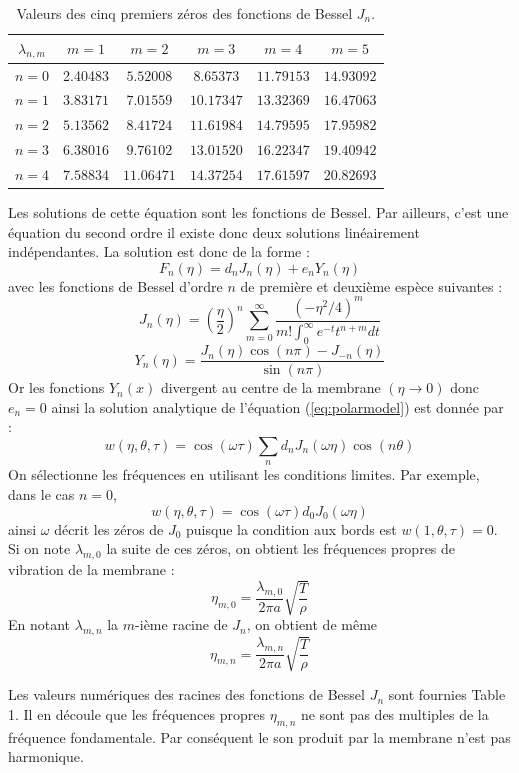 \documentclass[a4,12pt]{article}
\begin{document}
\begin{table}
	\begin{center}
		\begin{tabular}{|c|c|c|c|c|c|}
			\hline
			$\lambda_{n,m}$&$m=1$  &$m=2$ & $m=3$ &$ m=4$&$m=5$\\
			\hline
			$n=0$&2.40483&$5.52008$&$8.65373$&$11.79153$&$14.93092$\\
			\hline
			$n=1$&$3.83171$&$7.01559$&$10.17347$&$13.32369$&$16.47063$\\
			\hline
			$n=2$&$5.13562$&$8.41724$&$11.61984$&$14.79595$&$17.95982$\\
			\hline
			$n=3$&$6.38016$&$9.76102$&$13.01520$&$16.22347$&$19.40942$\\
			\hline
			$n=4$&$7.58834$&$11.06471$&$14.37254$&$17.61597$&$20.82693$\\
			\hline
		\end{tabular}
		\caption{Valeurs des cinq premiers zéros des fonctions de Bessel $J_n$.}
 	\end{center}
\end{table}

Les solutions de cette équation sont les fonctions de Bessel. Par ailleurs, c'est une équation du second ordre il existe donc deux solutions linéairement indépendantes. La solution est donc de la forme :
\[
F_n(\eta)=d_nJ_n(\eta)+e_nY_n(\eta)
\]
avec les fonctions de Bessel d'ordre $n$ de première et deuxième espèce suivantes :
\[
J_n(\eta)=\left(\dfrac{\eta}{2}\right)^n\sum_{m=0}^{\infty} \dfrac{(-\eta^2/4)^m}{m!\int_0^{\infty}e^{-t}t^{n+m}dt}
\]
\[
Y_n(\eta)=\dfrac{J_n(\eta)\cos(n\pi)-J_{-n}(\eta)}{\sin(n\pi)}
\]
Or les fonctions $Y_n(x)$ divergent au centre de la membrane $(\eta\rightarrow 0)$ donc $e_n=0$
ainsi la solution analytique de l'équation (\ref{eq:polarmodel}) est donnée par :
\[
w(\eta,\theta,\tau)=\cos(\omega \tau)\sum_n d_nJ_n(\omega\eta)\cos(n\theta)
\]
On sélectionne les fréquences en utilisant les conditions limites. Par exemple, dans le cas $n=0$, 
\[
w(\eta,\theta,\tau)=\cos(\omega \tau) d_0J_0(\omega \eta)
\]
ainsi $\omega$ décrit les zéros de $J_0$ puisque la condition aux bords est $w(1,\theta,\tau)=0$. Si on note $\lambda_{m,0}$ la suite de ces zéros, on obtient les fréquences propres de vibration de la membrane :
\[
\eta_{m,0}=\dfrac{\lambda_{m,0}}{2\pi a} \sqrt{\frac{T}{\rho}}
\]
En notant $\lambda_{m,n}$ la $m$-ième racine de $J_n$, on obtient de même 
\[
\eta_{m,n}=\dfrac{\lambda_{m,n}}{2\pi a} \sqrt{\frac{T}{\rho}}
\]

Les valeurs numériques des racines des fonctions de Bessel $J_n$ sont fournies Table 1. Il en découle que les fréquences propres $\eta_{m,n}$ ne sont pas des multiples de la fréquence fondamentale. Par conséquent le son produit par la membrane n'est pas harmonique.
\end{document}
